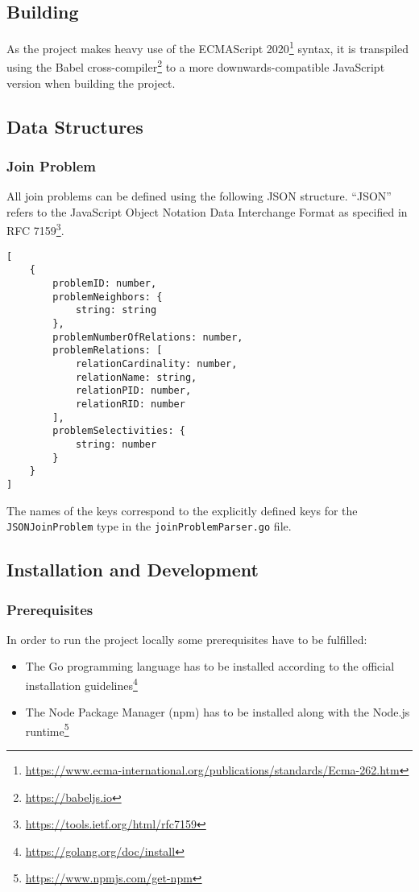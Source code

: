 \subsection{Building}
As the project makes heavy use of the ECMAScript 2020\footnote{\url{https://www.ecma-international.org/publications/standards/Ecma-262.htm}} syntax, it is transpiled using the Babel cross-compiler\footnote{\url{https://babeljs.io}} to a more downwards-compatible JavaScript version when building the project.

\newpage
\subsection{Data Structures}
\label{sub:data-structures}

\subsubsection{Join Problem}
\label{subsub:join-problem-data-structure}

All join problems can be defined using the following JSON structure. ``JSON'' refers to the JavaScript Object Notation Data Interchange Format as specified in RFC 7159\footnote{\url{https://tools.ietf.org/html/rfc7159}}.
\begin{verbatim}
[
    {
        problemID: number,
        problemNeighbors: {
            string: string
        },
        problemNumberOfRelations: number,
        problemRelations: [
            relationCardinality: number,
            relationName: string,
            relationPID: number,
            relationRID: number
        ],
        problemSelectivities: {
            string: number
        }
    }
]
\end{verbatim}
The names of the keys correspond to the explicitly defined keys for the \texttt{JSONJoinProblem} type in the \texttt{joinProblemParser.go} file.

\subsection{Installation and Development}

\subsubsection{Prerequisites}
In order to run the project locally some prerequisites have to be fulfilled:
\begin{itemize}
    \item The Go programming language has to be installed according to the official installation guidelines\footnote{\url{https://golang.org/doc/install}}
    \item The Node Package Manager (npm) has to be installed along with the Node.js runtime\footnote{\url{https://www.npmjs.com/get-npm}}
\end{itemize}

